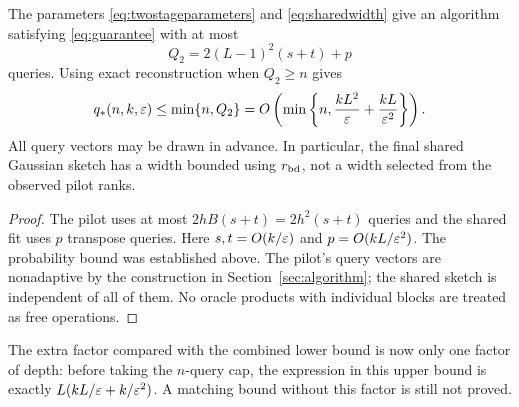 \begin{theorem}\label{thm:twostage}
The parameters \eqref{eq:twostageparameters} and
\eqref{eq:sharedwidth} give an algorithm satisfying
\eqref{eq:guarantee} with at most
\begin{equation}\label{eq:twostagebudget}
 Q_2=2(L-1)^2(s+t)+p
\end{equation}
queries. Using exact reconstruction when $Q_2\ge n$ gives
\[
 q_*(n,k,\varepsilon)\le\min\{n,Q_2\}
 =O\left(\min\left\{n,\frac{kL^2}{\varepsilon}
                            +\frac{kL}{\varepsilon^2}\right\}\right).
\]
All query vectors may be drawn in advance. In particular, the final shared
Gaussian sketch has a width bounded using $r_{\rm bd}$, not a width selected
from the observed pilot ranks.
\end{theorem}
\begin{proof}
The pilot uses at most $2hB(s+t)=2h^2(s+t)$ queries and the shared fit uses
$p$ transpose queries. Here $s,t=O(k/\varepsilon)$ and
$p=O(kL/\varepsilon^2)$. The probability bound was established above.
The pilot's query vectors are nonadaptive by the construction in
Section~\ref{sec:algorithm}; the shared sketch is independent of all of them.
No oracle products with individual blocks are treated as free operations.
\end{proof}

The extra factor compared with the combined lower bound is now only one
factor of depth: before taking the $n$-query cap, the expression in this
upper bound is exactly $L(kL/\varepsilon+k/\varepsilon^2)$. A matching bound without this
factor is still not proved.
